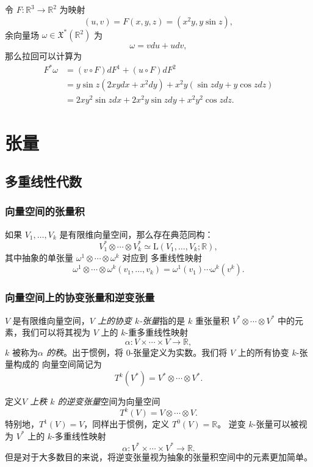 \documentclass[fontset=none]{Notes}
\newcommand{\LL}{{\mathrm{L}}}
\begin{document}
\begin{example}
  令 $F:\mathbb{R}^3\to \mathbb{R}^2$ 为映射
  \[
    (u,v)=F(x,y,z) =(x^2y,y\sin z),
  \]
  余向量场 $\omega\in \mathfrak{X}^*(\mathbb{R}^2)$ 为
  \[
    \omega=vdu+udv,  
  \]
  那么拉回可以计算为
  \begin{align*}
    F^*\omega&=(v\circ F)dF^1+(u\circ F)dF^2\\
    &=y\sin z (2xydx+x^2dy)+x^2y(\sin zdy+y\cos zdz)\\
    &=2xy^2\sin z dx+2x^2y\sin zdy+x^2y^2\cos zdz.
  \end{align*}
\end{example}


\chapter{张量}

\section{多重线性代数}

\subsection{向量空间的张量积}

\begin{proposition}
  如果 $V_1,\dots,V_k$ 是有限维向量空间，那么存在典范同构：
  \[
    V_1^*\otimes \cdots\otimes V_k^*\simeq \LL(V_1,\dots,V_k;\mathbb{R}),
  \]
  其中抽象的单张量 $\omega^1\otimes \cdots\otimes\omega^k$ 对应到
  多重线性映射
  \[
    \omega^1\otimes\cdots\otimes\omega^k(v_1,\dots,v_k)=
    \omega^1(v_1)\cdots \omega^k(v^k).  
  \]
\end{proposition}

\subsection{向量空间上的协变张量和逆变张量}

$V$ 是有限维向量空间，\emph{$V$ 上的协变 $k$-张量}指的是
$k$ 重张量积 $V^*\otimes\cdots\otimes V^*$ 中的元素，我们可以将其视为
$V$ 上的 $k$-重多重线性映射
\[
  \alpha:V\times\cdots\times V\to \mathbb{R},
\]
$k$ 被称为\emph{$\alpha$ 的秩}。出于惯例，将 $0$-张量定义为实数。我们将 $V$ 上的所有协变 $k$-张量构成的
向量空间简记为
\[
  T^k(V^*)=V^*\otimes\cdots\otimes V^*.
\]

定义\emph{$V$ 上秩 $k$ 的逆变张量}空间为向量空间
\[
  T^k(V)=V\otimes \cdots\otimes V.  
\]
特别地，$T^1(V)=V$，同样出于惯例，定义 $T^0(V)=\mathbb{R}$。
逆变 $k$-张量可以被视为 $V^*$ 上的 $k$-多重线性映射
\[
  \alpha:V^*\times \cdots\times V^*\to \mathbb{R} . 
\]
但是对于大多数目的来说，将逆变张量视为抽象的张量积空间中的元素更加简单。
\end{document}
